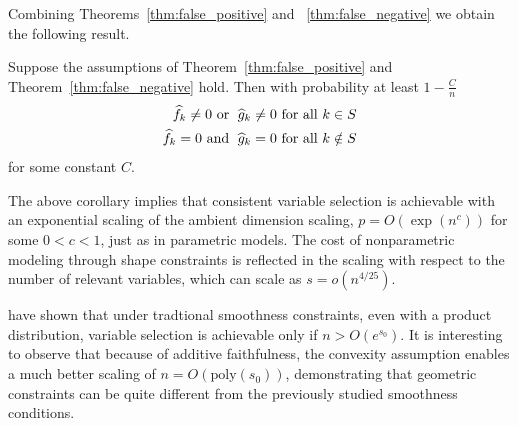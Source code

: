 Combining Theorems~\ref{thm:false_positive} and
~\ref{thm:false_negative} 
we obtain the following result.
\begin{corollary}
  Suppose the assumptions of Theorem~\ref{thm:false_positive} and
  Theorem~\ref{thm:false_negative} hold.  
Then with probability at least $1-\frac{C}{n}$
\begin{align}
\widehat{f}_k \neq 0 \textrm{ or }\; \widehat{g}_k \neq 0 &\textrm{ for all } k \in S\\
\widehat{f}_k = 0 \textrm{ and }\; \widehat{g}_k = 0 & \textrm{ for all } k \notin S
\end{align}
for some constant $C$.

\end{corollary}
The above corollary implies that consistent variable selection is
achievable with an exponential scaling of the ambient dimension
scaling, $p = O(\exp(n^c))$ for some $0<c<1$, just as in parametric models.
The cost of nonparametric modeling through shape constraints is
reflected in the scaling with respect to the number of relevant
variables, which can scale as $s = o(n^{4/25})$.

\begin{remark}
  \citet{dalalyan:12} have shown that under tradtional smoothness
  constraints, even with a product distribution, variable selection is
  achievable only if $n > O(e^{s_0})$. It is interesting to observe that
  because of additive faithfulness, the convexity assumption enables a
  much better scaling of $n = O(\textrm{poly}(s_0))$, demonstrating that
  geometric constraints can be quite different from the previously
  studied smoothness conditions.
\end{remark}



 
